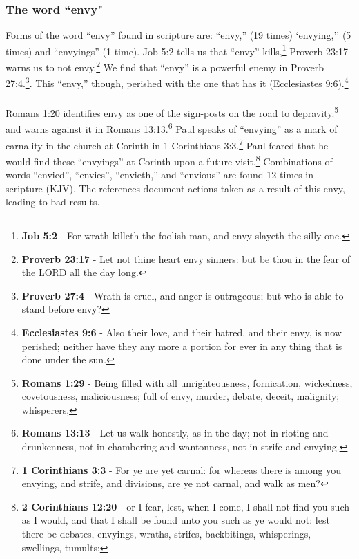 \subsubsection{The word ``envy"}

Forms of the word ``envy'' found in scripture are: ``envy,'' (19 times)  `envying,'' (5 times) and ``envyings'' (1 time). Job 5:2 tells us that ``envy'' kills,\footnote{\textbf{Job 5:2} - For wrath killeth the foolish man, and envy slayeth the silly one.}  Proverb 23:17 warns us to not envy.\footnote{\textbf{Proverb 23:17} - Let not thine heart envy sinners: but be thou in the fear of the LORD all the day long.} We find that ``envy'' is a powerful enemy in Proverb 27:4.\footnote{\textbf{Proverb 27:4} - Wrath is cruel, and anger is outrageous; but who is able to stand before envy?}. This ``envy,'' though, perished with the one that has it (Ecclesiastes 9:6).\footnote{\textbf{Ecclesiastes 9:6} - Also their love, and their hatred, and their envy, is now perished; neither have they any more a portion for ever in any thing that is done under the sun.}\\
\\
Romans 1:20 identifies envy as one of the sign-posts on the road to depravity.\footnote{\textbf{Romans 1:29} - Being filled with all unrighteousness, fornication, wickedness, covetousness, maliciousness; full of envy, murder, debate, deceit, malignity; whisperers,} and warns against it in Romans 13:13.\footnote{\textbf{Romans 13:13} - Let us walk honestly, as in the day; not in rioting and drunkenness, not in chambering and wantonness, not in strife and envying.} Paul speaks of ``envying'' as a mark of carnality in the church at Corinth in 1 Corinthians 3:3.\footnote{\textbf{1 Corinthians 3:3} - For ye are yet carnal: for whereas there is among you envying, and strife, and divisions, are ye not carnal, and walk as men?} Paul feared that he would find these ``envyings'' at Corinth upon a future visit.\footnote{\textbf{2 Corinthians 12:20} - or I fear, lest, when I come, I shall not find you such as I would, and that I shall be found unto you such as ye would not: lest there be debates, envyings, wraths, strifes, backbitings, whisperings, swellings, tumults:}
\noindent Combinations of words ``envied'', ``envies'', ``envieth,'' and ``envious'' are found 12 times in scripture (KJV). The references document actions taken as a result of this envy, leading to bad results.
